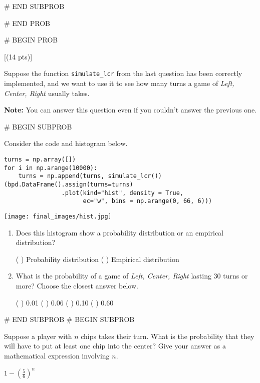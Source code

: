 \documentclass[twoside,12pt]{article}
\begin{document}
{# END SUBPROB




# END PROB

\newpage
# BEGIN PROB

[(14 pts)]

Suppose the function \texttt{simulate\_lcr} from the last question has been correctly implemented, and we want to use it to see how many turns a game of \textit{Left, Center, Right} usually takes. 

\textbf{Note:} You can answer this question even if you couldn't answer the previous one.


    # BEGIN SUBPROB

 Consider the code and histogram below.

\begin{verbatim}
turns = np.array([])
for i in np.arange(10000):
    turns = np.append(turns, simulate_lcr())   
(bpd.DataFrame().assign(turns=turns)
                .plot(kind="hist", density = True, 
                      ec="w", bins = np.arange(0, 66, 6)))
\end{verbatim}

\begin{center}
\texttt{[image: final\_images/hist.jpg]}
\end{center}

        \begin{enumerate}[label=(\roman*)]
        \item Does this histogram show a probability distribution or an empirical distribution?

        \begin{center}        
            ( ) Probability distribution
            ( ) Empirical distribution
        \end{center}

        \item What is the probability of a game of \textit{Left, Center, Right} lasting 30 turns or more?  Choose the closest answer below.

        \begin{center}
            ( ) 0.01        
            ( ) 0.06        
            ( ) 0.10        
            ( ) 0.60
        \end{center}
        
        \end{enumerate}
    

# END SUBPROB
    # BEGIN SUBPROB


        Suppose a player with $n$ chips takes their turn. What is the probability that they will have to put at least one chip into the center? Give your answer as a mathematical expression involving $n$.
        \begin{responsebox}{0.5in}
            $1 - \left(\frac{5}{6}\right)^n$
        \end{responsebox}
    

}
\end{document}
